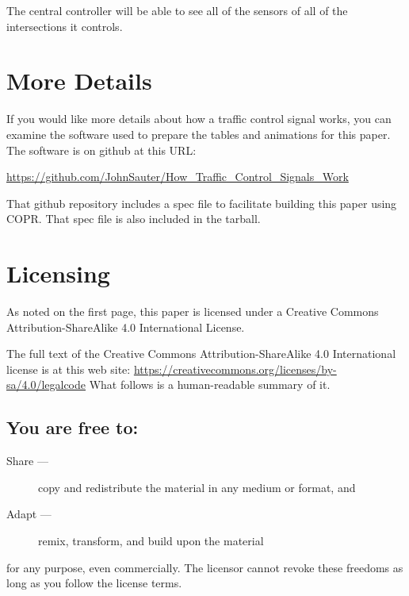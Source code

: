 \documentclass[letterpaper,twoside]{article}
\begin{document}
The central controller will be able to see all of the sensors of all
of the intersections it controls.

\section{More Details}

If you would like more details about how a traffic control signal works,
you can examine the software used to prepare the tables and animations
for this paper.  The software is on github at this URL:

\href{https://github.com/JohnSauter/How\_Traffic\_Control\_Signals\_Work}{https://github.com/JohnSauter/How\_Traffic\_Control\_Signals\_Work}

That github repository includes a spec file to facilitate building
this paper using COPR.  That spec file is also included in the tarball.

\section{Licensing}
\label{section:Licensing}
As noted on the first page, this paper is licensed under a Creative
Commons Attribution-ShareAlike 4.0 International License.

The full text of the Creative Commons Attribution-ShareAlike 4.0
International license is at this web site:
\href{https://creativecommons.org/licenses/by-sa/4.0/legalcode}{https://creativecommons.org/licenses/by-sa/4.0/legalcode}
What follows is a human-readable summary of it.

\subsection{You are free to:}
\begin{description}
\item[Share ---]copy and redistribute the material in any medium or format, and
\item[Adapt ---]remix, transform, and build upon the material
\end{description}
for any purpose, even commercially.  The licensor cannot revoke these
freedoms as long as you follow the license terms.
\end{document}
